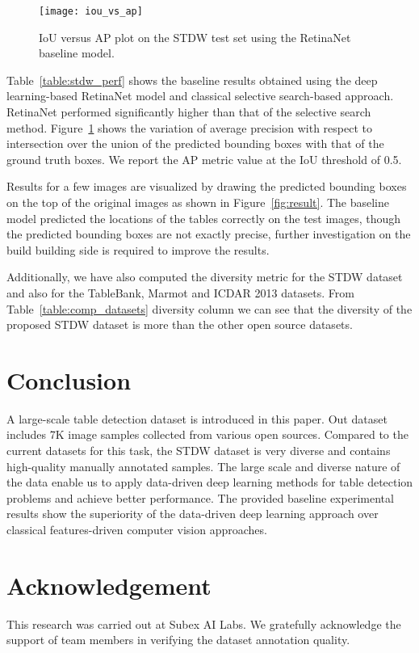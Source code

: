 \documentclass[a4paper,conference]{IEEEtran}
\begin{document}
\begin{figure}[h]
  \centering
      \texttt{[image: iou\_vs\_ap]}
\caption{IoU versus AP plot on the STDW test set using the RetinaNet baseline model.}
\label{fig:iou_vs_ap}
\end{figure}

Table~\ref{table:stdw_perf} shows the baseline results obtained using the deep learning-based RetinaNet model and classical selective search-based approach. RetinaNet performed significantly higher than that of the selective search method.
Figure~\ref{fig:iou_vs_ap} shows the variation of average precision with respect to intersection over the union of the predicted bounding boxes with that of the ground truth boxes. We report the AP metric value at the IoU threshold of 0.5. 

Results for a few images are visualized by drawing the predicted bounding boxes on the top of the original images as shown in Figure~\ref{fig:result}.  The baseline model predicted the locations of the tables correctly on the test images, though the predicted bounding boxes are not exactly precise, further investigation on the build building side is required to improve the results.  

Additionally, we have also computed the diversity metric for the STDW dataset and also for the TableBank, Marmot and ICDAR 2013 datasets. From Table~\ref{table:comp_datasets} diversity column we can see that the diversity of the proposed STDW dataset is more than the other open source datasets.  



















\section{Conclusion}
A large-scale table detection dataset is introduced in this paper. Out dataset includes 7K image samples collected from various open sources. Compared to the current datasets for this task, the STDW dataset is very diverse and contains high-quality manually annotated samples. 
The large scale and diverse nature of the data enable us to apply data-driven deep learning methods for table detection problems and achieve better performance. 
The provided baseline experimental results show the superiority of the data-driven deep learning approach over classical features-driven computer vision approaches.

\section*{Acknowledgement}
This research was carried out at Subex AI Labs. We gratefully acknowledge the support of team members in verifying the dataset annotation quality. 





















\end{document}
